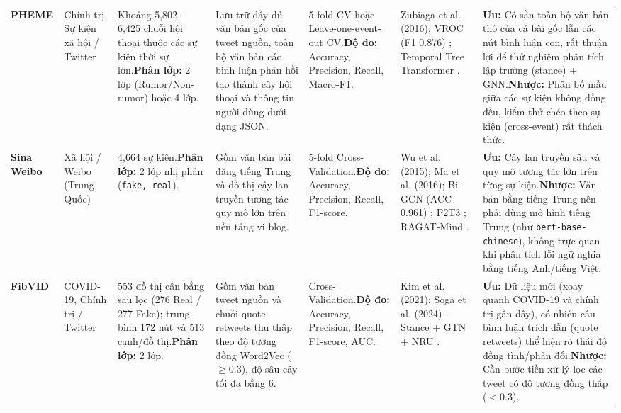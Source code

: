 \documentclass[11pt,a4paper]{extreport}
\begin{document}
\begin{landscape}
\begin{longtable}{@{}p{2.8cm}p{2.2cm}p{2.8cm}p{3.8cm}p{3.2cm}p{3.6cm}p{4.2cm}@{}}
\textbf{PHEME} \cite{noauthor_fake_2023, noauthor_detection_2025} & Chính trị, Sự kiện xã hội / Twitter & Khoảng 5,802 -- 6,425 chuỗi hội thoại thuộc các sự kiện thời sự lớn.\newline \textbf{Phân lớp:} 2 lớp (Rumor/Non-rumor) hoặc 4 lớp. & Lưu trữ đầy đủ văn bản gốc của tweet nguồn, toàn bộ văn bản các bình luận phản hồi tạo thành cây hội thoại và thông tin người dùng dưới dạng JSON. & 5-fold CV hoặc Leave-one-event-out CV.\newline \textbf{Độ đo:} Accuracy, Precision, Recall, Macro-F1. & Zubiaga et al. (2016); VROC (F1 0.876) \cite{noauthor_detection_2025}; Temporal Tree Transformer \cite{wu_rumor_2025}. & \textbf{Ưu:} Có sẵn toàn bộ văn bản thô của cả bài gốc lẫn các nút bình luận con, rất thuận lợi để thử nghiệm phân tích lập trường (stance) + GNN.\newline \textbf{Nhược:} Phân bố mẫu giữa các sự kiện không đồng đều, kiểm thử chéo theo sự kiện (cross-event) rất thách thức. \\ 

\textbf{Sina Weibo} \cite{noauthor_disinformation_2024, noauthor_detection_2025} & Xã hội / Weibo (Trung Quốc) & 4,664 sự kiện.\newline \textbf{Phân lớp:} 2 lớp nhị phân (\texttt{fake, real}). & Gồm văn bản bài đăng tiếng Trung và đồ thị cây lan truyền tương tác quy mô lớn trên nền tảng vi blog. & 5-fold Cross-Validation.\newline \textbf{Độ đo:} Accuracy, Precision, Recall, F1-score. & Wu et al. (2015); Ma et al. (2016); Bi-GCN (ACC 0.961) \cite{noauthor_detection_2025}; P2T3 \cite{cui_avoiding_2026}; RAGAT-Mind \cite{qin_ragat-mind_2025}. & \textbf{Ưu:} Cây lan truyền sâu và quy mô tương tác lớn trên từng sự kiện.\newline \textbf{Nhược:} Văn bản bằng tiếng Trung nên phải dùng mô hình tiếng Trung (như \texttt{bert-base-chinese}), không trực quan khi phân tích lỗi ngữ nghĩa bằng tiếng Anh/tiếng Việt. \\ 

\textbf{FibVID} \cite{noauthor_exploiting_2024} & COVID-19, Chính trị / Twitter & 553 đồ thị cân bằng sau lọc (276 Real / 277 Fake); trung bình 172 nút và 513 cạnh/đồ thị.\newline \textbf{Phân lớp:} 2 lớp. & Gồm văn bản tweet nguồn và chuỗi quote-retweets thu thập theo độ tương đồng Word2Vec ($\ge 0.3$), độ sâu cây tối đa bằng 6. & Cross-Validation.\newline \textbf{Độ đo:} Accuracy, Precision, Recall, F1-score, AUC. & Kim et al. (2021); Soga et al. (2024) -- Stance + GTN + NRU \cite{noauthor_exploiting_2024}. & \textbf{Ưu:} Dữ liệu mới (xoay quanh COVID-19 và chính trị gần đây), có nhiều câu bình luận trích dẫn (quote retweets) thể hiện rõ thái độ đồng tình/phản đối.\newline \textbf{Nhược:} Cần bước tiền xử lý lọc các tweet có độ tương đồng thấp ($<0.3$). \\ 


\end{longtable}
\end{landscape}
\end{document}
